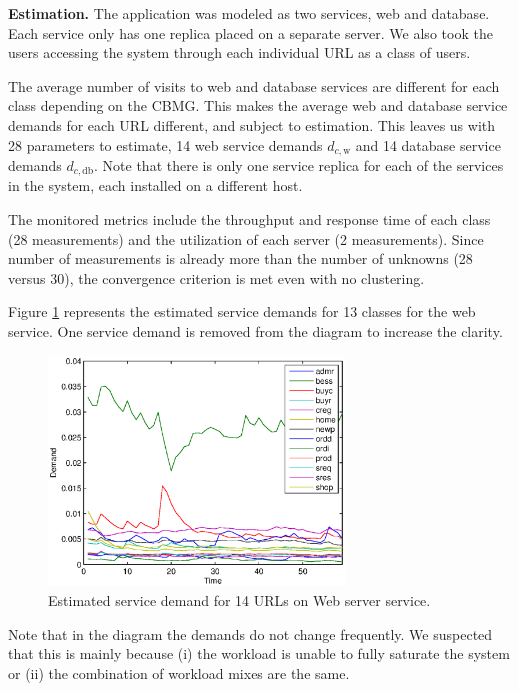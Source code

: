  \textbf{Estimation.} 
    The application was modeled as two services, web and database. Each service only has one replica placed on a separate server. We also took the users accessing the system through each individual URL as a class of users. 
    
		The average number of visits to web and database services are different for each class depending on the CBMG. This makes the average web and database service demands for each URL different, and subject to estimation. This leaves us with 28 parameters to estimate, 14 web service demands $d_{c,\text{w}}$ and 14 database service demands $d_{c,\text{db}}$. Note that there is only one service replica for each of the services in the system, each installed on a different host.
		
		The monitored metrics include the throughput and response time of each class (28 measurements) and the utilization of each server (2 measurements). Since number of measurements is already more than the number of unknowns (28 versus 30), the convergence criterion is met even with no clustering.

		Figure \ref{fig:estimated-demands-casestudy1} represents the estimated  service demands for 13 classes for the web service. One service demand is removed  from the diagram to increase the clarity. 
 \begin{figure}[htbp]
	\centering
	\includegraphics[width=0.7\textwidth]{image/demand13_estimated_kamlan.eps}
	\caption[A sample example of estimated service demand of 14 classes on a single service.]{Estimated service demand for 14  URLs on Web server service.}
	\label{fig:estimated-demands-casestudy1}
\end{figure}
Note that in the diagram the demands do not change frequently. We suspected that this is mainly because (i) the workload is unable to fully saturate the system or (ii) the combination of workload mixes are the same.
      
